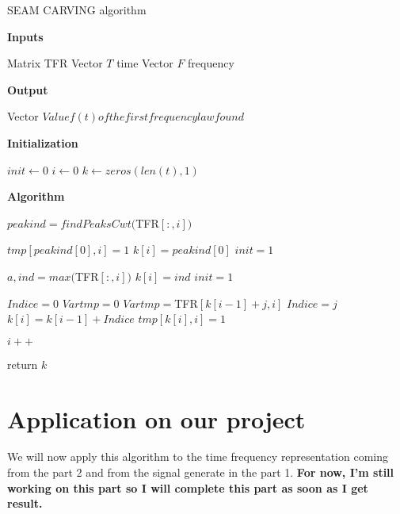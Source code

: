 \begin{algorithm}
  \caption{SEAM CARVING algorithm }
  
  \textbf{Inputs}%
  \begin{algorithmic}[1]
    \STATE Matrix TFR
    \STATE Vector $T$ time
    \STATE Vector $F$ frequency
  \end{algorithmic}
  \bigskip

  \textbf{Output}%
  \begin{algorithmic}[1]
    \STATE Vector $Value f(t) of the first frequency law found$
  \end{algorithmic}
  \bigskip
  
  \textbf{Initialization}%
  \begin{algorithmic}[1]
   	\STATE $init\gets 0$
   	\STATE $i\gets 0$
	\STATE $k\gets zeros(len(t),1)$
  \end{algorithmic}
  
  
  \textbf{Algorithm}%
  \begin{algorithmic}[1]

	 	
     	  	\STATE $peakind =findPeaksCwt($TFR$[:,i])$
     	
	 	
     	  		\STATE $tmp[peakind[0],i] = 1$
				\STATE $k[i] = peakind[0]$
				\STATE $init=1$
				
	 	
			\ELSE{}
     	  			\STATE $a,ind = max($TFR$[:,i]) $
					\STATE $k[i]=ind$
					\STATE $init=1$
				\ENDIF
			\ENDIF
				
		\ELSE
			\STATE $Indice = 0$
			\STATE $Vartmp = 0$
					\STATE $Vartmp = $TFR$[k[i-1]+j,i]$
					\STATE $Indice = j$
				\ENDIF
				\STATE $k[i] = k[i-1] + Indice$
				\STATE $tmp[k[i],i] = 1$
			\ENDFOR
  	 	
	 	\ENDIF
	 	\STATE $i++$
	\ENDWHILE 
	
	
  return $k$


  \end{algorithmic}
\end{algorithm}

\chapter{Application on our project}

We will now apply this algorithm to the time frequency representation coming from the part 2 and from the signal generate in the part 1.
\textbf{For now, I'm still working on this part so I will complete this part as soon as I get result.}